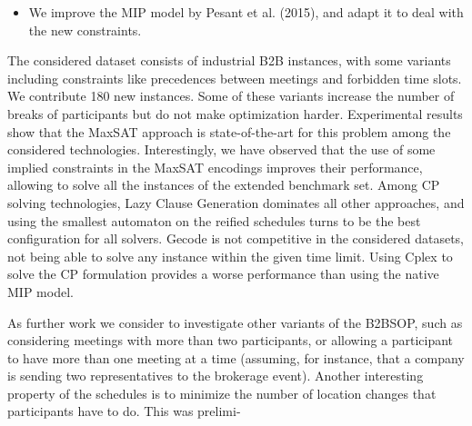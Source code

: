 \documentclass[10pt]{article}
\begin{document}
\begin{itemize}
  \item We improve the MIP model by Pesant et al. (2015), and adapt it to deal with the new constraints.
\end{itemize}

The considered dataset consists of industrial B2B instances, with some variants including constraints like precedences between meetings and forbidden time slots. We contribute 180 new instances. Some of these variants increase the number of breaks of participants but do not make optimization harder. Experimental results show that the MaxSAT approach is state-of-the-art for this problem among the considered technologies. Interestingly, we have observed that the use of some implied constraints in the MaxSAT encodings improves their performance, allowing to solve all the instances of the extended benchmark set. Among CP solving technologies, Lazy Clause Generation dominates all other approaches, and using the smallest automaton on the reified schedules turns to be the best configuration for all solvers. Gecode is not competitive in the considered datasets, not being able to solve any instance within the given time limit. Using Cplex to solve the CP formulation provides a worse performance than using the native MIP model.

As further work we consider to investigate other variants of the B2BSOP, such as considering meetings with more than two participants, or allowing a participant to have more than one meeting at a time (assuming, for instance, that a company is sending two representatives to the brokerage event). Another interesting property of the schedules is to minimize the number of location changes that participants have to do. This was prelimi-
\end{document}
